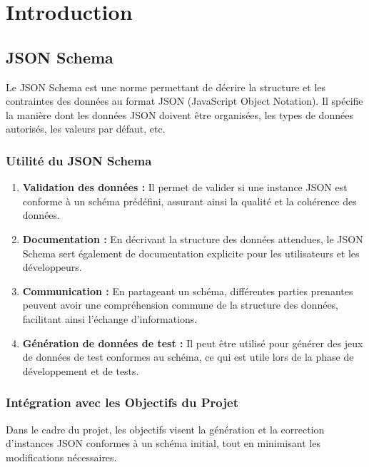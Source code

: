 \chapter{Introduction}



\section{JSON Schema}

Le JSON Schema \cite{JSON_Schema} est une norme permettant de décrire la structure et les contraintes des données au format JSON (JavaScript Object Notation). Il spécifie la manière dont les données JSON doivent être organisées, les types de données autorisés, les valeurs par défaut, etc.

\subsection{Utilité du JSON Schema}

\begin{enumerate}
    \item \textbf{Validation des données :} Il permet de valider si une instance JSON est conforme à un schéma prédéfini, assurant ainsi la qualité et la cohérence des données.
    
    \item \textbf{Documentation :} En décrivant la structure des données attendues, le JSON Schema sert également de documentation explicite pour les utilisateurs et les développeurs.
    
    \item \textbf{Communication :} En partageant un schéma, différentes parties prenantes peuvent avoir une compréhension commune de la structure des données, facilitant ainsi l'échange d'informations.
    
    \item \textbf{Génération de données de test :} Il peut être utilisé pour générer des jeux de données de test conformes au schéma, ce qui est utile lors de la phase de développement et de tests.
\end{enumerate}

\subsection{Intégration avec les Objectifs du Projet}

Dans le cadre du projet, les objectifs visent la génération et la correction d'instances JSON conformes à un schéma initial, tout en minimisant les modifications nécessaires. 

